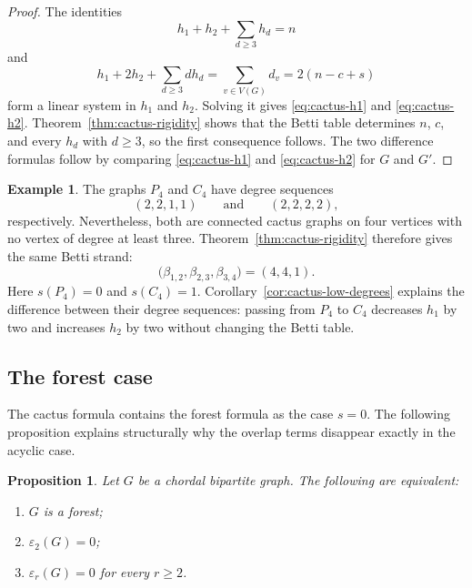 \documentclass[11pt]{amsart}
\newtheorem{proposition}[theorem]{Proposition}
\theoremstyle{definition}
\newtheorem{example}[theorem]{Example}
\theoremstyle{remark}
\numberwithin{equation}{section}
\begin{document}
	\begin{proof}
		The identities
		\[
		h_1+h_2+\sum_{d\ge3}h_d=n
		\]
		and
		\[
		h_1+2h_2+\sum_{d\ge3}d h_d
		=\sum_{v\in V(G)}d_v
		=2(n-c+s)
		\]
		form a linear system in \(h_1\) and \(h_2\). Solving it gives
		\eqref{eq:cactus-h1} and \eqref{eq:cactus-h2}. Theorem~\ref{thm:cactus-rigidity} shows that the Betti table determines
		\(n\), \(c\),
		and every \(h_d\) with \(d\ge3\), so the first consequence follows. The two
		difference formulas follow by comparing \eqref{eq:cactus-h1} and
		\eqref{eq:cactus-h2} for \(G\) and \(G'\).
	\end{proof}

	\begin{example}\label{ex:path-square-same-betti}
		The graphs \(P_4\) and \(C_4\) have degree sequences
		\[
		(2,2,1,1)
		\qquad\text{and}\qquad
		(2,2,2,2),
		\]
		respectively. Nevertheless, both are connected cactus graphs on four vertices
		with no vertex of degree at least three. Theorem~\ref{thm:cactus-rigidity}
		therefore gives the same Betti strand:
		\[
		\bigl(\beta_{1,2},\beta_{2,3},\beta_{3,4}\bigr)=(4,4,1).
		\]
		Here \(s(P_4)=0\) and \(s(C_4)=1\). Corollary~\ref{cor:cactus-low-degrees}
		explains the difference between their degree sequences: passing from \(P_4\)
		to \(C_4\) decreases \(h_1\) by two and increases \(h_2\) by two without
		changing the Betti table.
	\end{example}

	\subsection{The forest case}

	The cactus formula contains the forest formula as the case \(s=0\). The
	following proposition explains structurally why the overlap terms disappear
	exactly in the acyclic case.

	\begin{proposition}\label{prop:forest-zero-overlap}
		Let \(G\) be a chordal bipartite graph. The following are equivalent:
		\begin{enumerate}[label=\textup{(\roman*)}]
			\item \(G\) is a forest;
			\item \(\varepsilon_2(G)=0\);
			\item \(\varepsilon_r(G)=0\) for every \(r\ge2\).
		\end{enumerate}
	\end{proposition}
\end{document}
